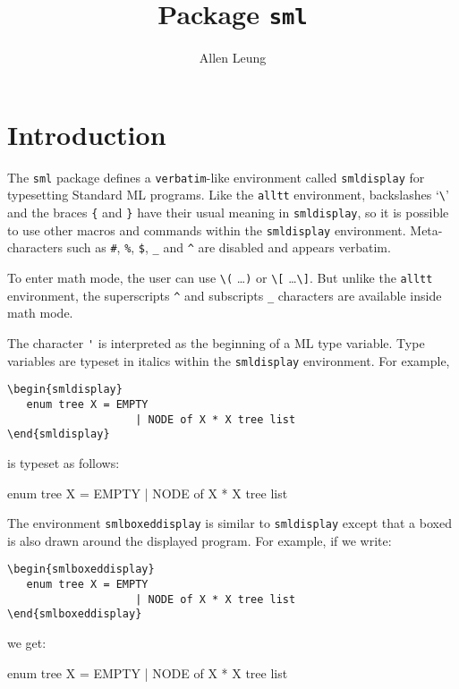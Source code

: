 \documentclass{article}
\title{Package {\tt sml}}
\author{Allen Leung}
\begin{document}
  \maketitle
\section{Introduction}
  The \verb|sml| package defines a \verb|verbatim|-like environment
called \verb|smldisplay|
for typesetting Standard ML programs.   
Like the \verb|alltt| environment, 
backslashes `\verb|\|' and the braces \verb|{|
and \verb|}| have their usual meaning in \verb|smldisplay|, 
so it is possible to use other
macros and commands within the \verb|smldisplay| environment.
Meta-characters such as \verb|#|, \verb|%|, 
\verb|$|, \verb|_| and \verb|^| are disabled and appears verbatim.  

To enter math mode, the user can use \verb|\(| \ldots \verb|)| or
\verb|\[| \ldots \verb|\]|.  But unlike the \verb|alltt| environment,
the superscripts \verb|^| and subscripts \verb|_| characters
are available inside math mode. 

The character \verb|'| is interpreted as the beginning of a ML 
type variable.  Type variables are typeset 
in italics within the \verb|smldisplay| environment.  For example, 
\begin{verbatim}
\begin{smldisplay} 
   enum tree X = EMPTY
                    | NODE of X * X tree list
\end{smldisplay}
\end{verbatim}
is typeset as follows:
\begin{smldisplay} 
   enum tree X = EMPTY 
                    | NODE of X * X tree list
\end{smldisplay}

The environment \verb|smlboxeddisplay| is similar to \verb|smldisplay|
except that a boxed is also drawn around the displayed program.
For example, if we write:
\begin{verbatim}
\begin{smlboxeddisplay} 
   enum tree X = EMPTY 
                    | NODE of X * X tree list
\end{smlboxeddisplay}
\end{verbatim}
we get:
\begin{smlboxeddisplay} 
   enum tree X = EMPTY 
                    | NODE of X * X tree list
\end{smlboxeddisplay}
\end{document}
